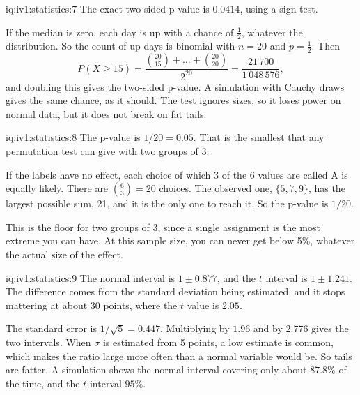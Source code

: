\begin{solution}{iq:iv1:statistics:7}
The exact two-sided p-value is $0.0414$, using a sign test.

If the median is zero, each day is up with a chance of $\tfrac12$, whatever the distribution. So the count of up days is binomial with $n = 20$ and $p = \tfrac12$. Then
\[
P(X \ge 15) = \frac{\binom{20}{15} + \dots + \binom{20}{20}}{2^{20}} = \frac{21\,700}{1\,048\,576},
\]
and doubling this gives the two-sided p-value. A simulation with Cauchy draws gives the same chance, as it should. The test ignores sizes, so it loses power on normal data, but it does not break on fat tails.

\end{solution}

\begin{solution}{iq:iv1:statistics:8}
The p-value is $1/20 = 0.05$. That is the smallest that any permutation test can give with two groups of 3.

If the labels have no effect, each choice of which 3 of the 6 values are called A is equally likely. There are $\binom{6}{3} = 20$ choices. The observed one, $\{5, 7, 9\}$, has the largest possible sum, 21, and it is the only one to reach it. So the p-value is $1/20$.

This is the floor for two groups of 3, since a single assignment is the most extreme you can have. At this sample size, you can never get below 5\%, whatever the actual size of the effect.

\end{solution}

\begin{solution}{iq:iv1:statistics:9}
The normal interval is $1 \pm 0.877$, and the $t$ interval is $1 \pm 1.241$. The difference comes from the standard deviation being estimated, and it stops mattering at about 30 points, where the $t$ value is $2.05$.

The standard error is $1/\sqrt{5} = 0.447$. Multiplying by $1.96$ and by $2.776$ gives the two intervals. When $\sigma$ is estimated from 5 points, a low estimate is common, which makes the ratio large more often than a normal variable would be. So tails are fatter. A simulation shows the normal interval covering only about $87.8\%$ of the time, and the $t$ interval $95\%$.

\end{solution}


